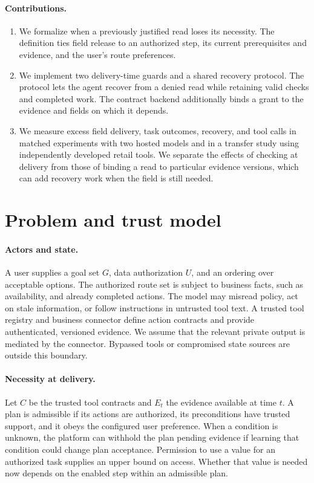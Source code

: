 \documentclass[10pt,twocolumn]{article}
\begin{document}
\paragraph{Contributions.}
\begin{enumerate}
\item We formalize when a previously justified read loses its necessity. The definition ties field release to an authorized step, its current prerequisites and evidence, and the user's route preferences.
\item We implement two delivery-time guards and a shared recovery protocol. The protocol lets the agent recover from a denied read while retaining valid checks and completed work. The contract backend additionally binds a grant to the evidence and fields on which it depends.
\item We measure excess field delivery, task outcomes, recovery, and tool calls in matched experiments with two hosted models and in a transfer study using independently developed retail tools. We separate the effects of checking at delivery from those of binding a read to particular evidence versions, which can add recovery work when the field is still needed.
\end{enumerate}

\section{Problem and trust model}
\paragraph{Actors and state.}
A user supplies a goal set $G$, data authorization $U$, and an ordering over acceptable options. The authorized route set is subject to business facts, such as availability, and already completed actions. The model may misread policy, act on stale information, or follow instructions in untrusted tool text. A trusted tool registry and business connector define action contracts and provide authenticated, versioned evidence. We assume that the relevant private output is mediated by the connector. Bypassed tools or compromised state sources are outside this boundary.

\paragraph{Necessity at delivery.}
Let $C$ be the trusted tool contracts and $E_t$ the evidence available at time $t$. A plan is admissible if its actions are authorized, its preconditions have trusted support, and it obeys the configured user preference. When a condition is unknown, the platform can withhold the plan pending evidence if learning that condition could change plan acceptance. Permission to use a value for an authorized task supplies an upper bound on access. Whether that value is needed now depends on the enabled step within an admissible plan.
\end{document}
